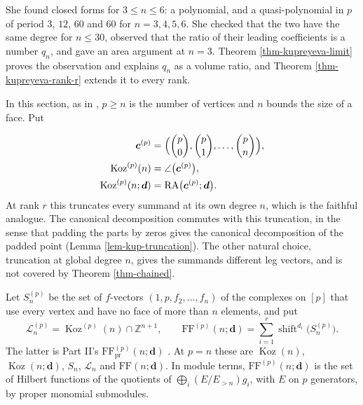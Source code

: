 \documentclass[11pt, a4paper, abstract=yes]{scrartcl}
\theoremstyle{definition}
\theoremstyle{remark}
\theoremstyle{plain}
\newcommand{\vek}[1]{\boldsymbol{#1}}
\theoremstyle{remark}
\theoremstyle{plain}
\newcommand{\Koz}{\operatorname{Koz}}
\newcommand{\shift}{\operatorname{shift}}
\newcommand{\rasimp}{\angle}
\newcommand{\RA}{\operatorname{RA}}
\newcommand{\FF}{\mathrm{FF}}
\begin{document}
She found closed forms for \(3\le n\le6\): a polynomial, and a quasi-polynomial in \(p\) of period
\(3\), \(12\), \(60\) and \(60\) for \(n=3,4,5,6\). She checked that the two have the same degree for
\(n\le30\), observed that the ratio of their leading coefficients is a number \(q_n\), and gave an
area argument at \(n=3\). Theorem \ref{thm-kupreyeva-limit} proves the observation and explains
\(q_n\) as a volume ratio, and Theorem \ref{thm-kupreyeva-rank-r} extends it to every rank.

In this section, as in \autocite[Section 9]{SnellmanArticle2}, \(p\ge n\) is the number of vertices and
\(n\) bounds the size of a face. Put

\begin{equation}\label{eq:kup-defs}
\begin{aligned}
  \vek c^{(p)}&=\Bigl(\binom p0,\binom p1,\dots,\binom pn\Bigr),\\
  \Koz^{(p)}(n)&=\rasimp\bigl(\vek c^{(p)}\bigr),\\
  \Koz^{(p)}(n;\vek d)&=\RA\bigl(\vek c^{(p)};\vek d\bigr).
\end{aligned}
\end{equation}
At rank \(r\) this truncates every summand at its own degree \(n\), which is the faithful analogue.
The canonical decomposition commutes with this truncation, in the sense that padding the parts by
zeros gives the canonical decomposition of the padded point (Lemma \ref{lem-kup-truncation}). The other
natural choice, truncation at global degree \(n\), gives the summands different leg vectors, and is
not covered by Theorem \ref{thm-chained}.

Let \(S_n^{(p)}\) be the set of \(f\)-vectors \((1,p,f_2,\dots,f_n)\) of the complexes on \([p]\)
that use every vertex and have no face of more than \(n\) elements, and put
\begin{equation}\label{eq:kup-sets}
  \mathcal L_n^{(p)}=\Koz^{(p)}(n)\cap\mathbb Z^{n+1},\qquad
  \FF^{(p)}(n;\vek d)=\sum_{i=1}^r\shift^{d_i}\bigl(S_n^{(p)}\bigr).
\end{equation}
The latter is Part II's \(\FF^{(p)}_{\mathrm{pr}}(n;\vek d)\) \autocite[Theorem 60]{SnellmanArticle2}. At \(p=n\) these are
\(\Koz(n)\), \(\Koz(n;\vek d)\), \(S_n\), \(\mathcal L_n\) and \(\FF(n;\vek d)\). In module terms,
\(\FF^{(p)}(n;\vek d)\) is the set of Hilbert functions of the quotients of
\(\bigoplus_i(E/E_{>n})g_i\), with \(E\) on \(p\) generators, by proper monomial submodules.
\end{document}
